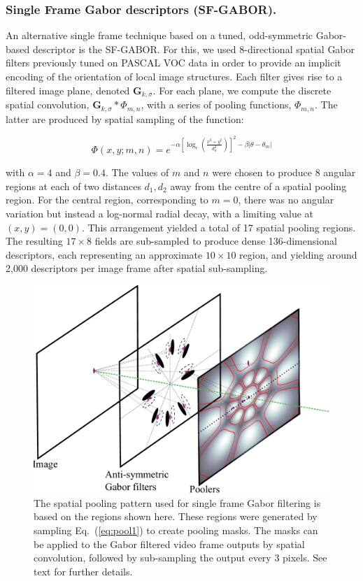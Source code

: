\subsubsection{Single Frame Gabor descriptors (SF-GABOR).}
\label{sec:sf-gabor}

An alternative single frame technique based on a tuned, odd-symmetric Gabor-based descriptor is the SF-GABOR. For this, we used $8$-directional spatial Gabor filters previously tuned on PASCAL VOC data \cite{Everingham2009} in order to provide an implicit encoding of the orientation of local image structures.  Each filter gives rise to a filtered image plane, denoted $\mathbf{G}_{k,\sigma}$.  For each plane, we compute the discrete spatial convolution, $\mathbf{G}_{k,\sigma} \ast {\Phi}_{m,n}$, with a series of pooling functions, ${\Phi}_{m,n}$. The latter are produced by spatial sampling of the function:

\begin{equation}
\Phi(x,y;m,n) = e^{-\alpha \left [\log_e \left ( \frac{x^2+y^2}{d_n^2}\right ) \right ]^2 - \beta |\theta-\theta_m | }
\label{eq:pool1}
\end{equation}

\noindent with $\alpha = 4$ and $\beta = 0.4$. The values of $m$ and $n$ were chosen to produce 8 angular regions at each of two distances $d_1, d_2$ away from the centre of a spatial pooling region.  For the central region, corresponding to $m=0$, there was no angular variation but instead a log-normal radial decay, with a limiting value at $(x,y)=(0,0)$. This arrangement yielded a total of  17 spatial pooling regions. The resulting $17 \times 8$ fields are sub-sampled to produce dense 136-dimensional descriptors, each representing an approximate $10 \times 10$ region, and yielding around 2,000 descriptors per image frame after spatial sub-sampling. 

\begin{figure}[t]
\centering
\includegraphics[width=0.7\linewidth]{./gfx/Chapter04/Layers.pdf}
\caption{The spatial pooling pattern used for single frame Gabor filtering is based on the regions shown here.  These regions were generated by sampling Eq.~(\ref{eq:pool1}) to create pooling masks. The masks can be applied to the Gabor filtered video frame outputs by spatial convolution, followed by sub-sampling the output every 3 pixels. See text for further details.}
\label{fig:IsoPool}
\end{figure}

